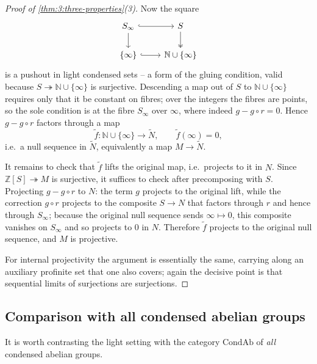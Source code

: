 \begin{proof}[Proof of \cref{thm:3:three-properties}(3)]
Now the square
\begin{equation*}
\begin{tikzcd}
S_\infty \arrow[r, hook] \arrow[d] & S \arrow[d, two heads] \\
\{\infty\} \arrow[r, hook] & \mathbb{N}\cup\{\infty\}
\end{tikzcd}
\end{equation*}
is a pushout in light condensed sets -- a form of the gluing condition, valid
because $S\twoheadrightarrow\mathbb{N}\cup\{\infty\}$ is surjective. Descending a
map out of $S$ to $\mathbb{N}\cup\{\infty\}$ requires only that it be constant on
fibres; over the integers the fibres are points, so the sole condition is at the
fibre $S_\infty$ over $\infty$, where indeed $g-g\circ r=0$. Hence $g-g\circ r$
factors through a map
\begin{equation*}
\widetilde{f}\colon \mathbb{N}\cup\{\infty\}\longrightarrow\widetilde{N},
\qquad \widetilde{f}(\infty)=0,
\end{equation*}
i.e.\ a null sequence in $\widetilde{N}$, equivalently a map $M\to\widetilde{N}$.

It remains to check that $\widetilde{f}$ lifts the original map, i.e.\ projects to
it in $N$. Since $\mathbb{Z}[S]\twoheadrightarrow M$ is surjective, it suffices to
check after precomposing with $S$. Projecting $g-g\circ r$ to $N$: the term $g$
projects to the original lift, while the correction $g\circ r$ projects to the
composite $S\to N$ that factors through $r$ and hence through $S_\infty$; because
the original null sequence sends $\infty\mapsto 0$, this composite vanishes on
$S_\infty$ and so projects to $0$ in $N$. Therefore $\widetilde{f}$ projects to
the original null sequence, and $M$ is projective.

For internal projectivity the argument is essentially the same, carrying along an
auxiliary profinite set that one also covers; again the decisive point is that
sequential limits of surjections are surjections.
\end{proof}

\subsection{Comparison with all condensed abelian groups}

It is worth contrasting the light setting with the category $\mathrm{CondAb}$ of
\emph{all} condensed abelian groups.

